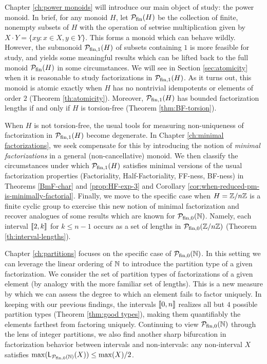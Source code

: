 Chapter \ref{ch:power monoids} will introduce our main object of study: the power monoid.  
In brief, for any monoid $H$, let $\mathcal{P}_{\textrm{fin}}(H)$ be the collection of finite, nonempty subsets of $H$ with the operation of setwise multiplication given by $X\cdot Y = \{xy: x\in X, y\in Y\}$.  
This forms a monoid which can behave wildly.
However, the submonoid $\mathcal{P}_{\textrm{fin}, 1}(H)$ of subsets containing $1$ is more feasible for study, and yields some meaningful results which can be lifted back to the full monoid $\mathcal{P}_{\textrm{fin}}(H)$ in some circumstances.
We will see in Section \ref{sec:atomicity} when it is reasonable to study factorizations in $\mathcal{P}_{\textrm{fin}, 1}(H)$.
As it turns out, this monoid is atomic exactly when $H$ has no nontrivial idempotents or elements of order $2$ (Theorem \ref{th:atomicity}).
Moreover, $\mathcal{P}_{\textrm{fin}, 1}(H)$ has bounded factorization lengths if and only if $H$ is torsion-free (Theorem \ref{thm:BF-torsion}).

When $H$ is not torsion-free, the usual tools for measuring non-uniqueness of factorization in $\mathcal{P}_{\textrm{fin}, 1}(H)$ become degenerate.
In Chapter \ref{ch:minimal factorizations}, we seek compensate for this by introducing the notion of \textit{minimal factorizations} in a general (non-cancellative) monoid.
We then classify the circumstances under which $\mathcal{P}_{\textrm{fin}, 1}(H)$ satisfies minimal versions of the usual factorization properties (Factoriality, Half-Factoriality, FF-ness, BF-ness) in Theorems \ref{BmF-char} and \ref{prop:HF-exp-3} and Corollary \ref{cor:when-reduced-pm-is-minimally-factorial}.
Finally, we move to the specific case when $H = \mathbb{Z}/n\mathbb{Z}$ is a finite cyclic group to exercise this new notion of minimal factorization and recover analogues of some results which are known for ${\mathcal{P}_{\textrm{fin},0}(\mathbb{N})}$.
Namely, each interval $\llbracket 2,k \rrbracket$ for $k\le n-1$ occurs as a set of lengths in $\mathcal{P}_{\textrm{fin}, 0}(\mathbb{Z}/n\mathbb{Z})$ (Theorem \ref{th:interval-lengths}).

Chapter \ref{ch:partitions} focuses on the specific case of ${\mathcal{P}_{\textrm{fin},0}(\mathbb{N})}$.
In this setting we can leverage the linear ordering of $\mathbb{N}$ to introduce the partition type of a given factorization.  
We consider the set of partition types of factorizations of a given element (by analogy with the more familiar set of lengths).
This is a new measure by which we can assess the degree to which an element fails to factor uniquely.  
In keeping with our previous findings, the intervals $\llbracket 0,n \rrbracket$ realizes all but $4$ possible partition types (Theorem \ref{thm:good types}), making them quantifiably the elements farthest from factoring uniquely.
Continuing to view ${\mathcal{P}_{\textrm{fin},0}(\mathbb{N})}$ through the lens of integer partitions, we also find another sharp bifurcation in factorization behavior between intervals and non-intervals: any non-interval $X$ satisfies $\max(\mathsf{L}_{{\mathcal{P}_{\textrm{fin},0}(\mathbb{N})}}(X) )\le \max(X)/2$.

